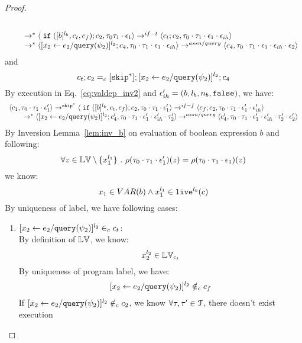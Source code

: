 \begin{proof}
\begin{case}[$\trace_2 = \trace_{ih} \cdot \event_{ih}$]
\begin{subcase}
\begin{subsubcase}
\begin{subproof}
\[\begin{array}{l}
  \\
  \qquad \rightarrow^{*} 
  \langle \;\mathtt{if}\; ([b]^{l_b}, c_t, c_f);{c}_2, \mathtt{\tau}_0 \mathtt{\tau}_1 \cdot \mathtt{\epsilon}_1 \rangle 
  \rightarrow^{if-t} 
  \langle c_t;c_2, \mathtt{\tau}_0 \cdot \mathtt{\tau}_1 \cdot \mathtt{\epsilon}_1 \cdot \mathtt{\epsilon}_{ih} \rangle 
  \\
  \qquad \rightarrow^{*} 
  \langle [\mathrel{ {x}_2 \leftarrow e_2 / {\tt query}(\psi_2) }]^{l_2};{c}_4, 
  \mathtt{\tau}_0 \cdot \mathtt{\tau}_1 \cdot \mathtt{\epsilon}_1 \cdot \mathtt{\epsilon}_{ih} \rangle 
  \rightarrow^{assn/query} 
  \langle {c}_4,  \mathtt{\tau}_0 \cdot \mathtt{\tau}_1 \cdot \mathtt{\epsilon}_1 \cdot \mathtt{\epsilon}_{ih} \cdot \mathtt{\epsilon}_2 \rangle 
  \end{array}
\]
and 
\[
  c_t;c_2 =_c [\mathtt{skip}^*]; [\mathrel{ {x}_2 \leftarrow e_2 / {\tt query}(\psi_2) }]^{l_2};{c}_4
\]
%
By execution in Eq.~\ref{eq:valdep_inv2} and $\mathtt{\epsilon}_{ih}' = (b, l_b, n_b, \mathtt{false})$, we have:
\begin{equation}
\label{eq:m1testif_inv2}
  \begin{array}{l}   
  \langle c_1, \mathtt{\tau}_0 \cdot \mathtt{\tau}_1 \cdot \mathtt{\epsilon}_1' \rangle 
  \rightarrow^{\mathtt{skip}^*} 
  \langle \;\mathtt{if}\; ([b]^{l_b}, c_t, c_f); {c}_2, \mathtt{\tau}_0 \cdot \mathtt{\tau}_1 \cdot \mathtt{\epsilon}_1' \rangle 
  \rightarrow^{if-f} 
  \langle c_f;c_2, \mathtt{\tau}_0 \cdot \mathtt{\tau}_1 \cdot \mathtt{\epsilon}_1' \cdot \mathtt{\epsilon}_{ih}' \rangle 
  \\
  \qquad \rightarrow^{*} 
  \langle [\mathrel{ {x}_2 \leftarrow e_2 / {\tt query}(\psi_2) }]^{l_2};{c}_4', 
  \mathtt{\tau}_0 \cdot \mathtt{\tau}_1 \cdot \mathtt{\epsilon}_1' \cdot \mathtt{\epsilon}_{ih}' \cdot \mathtt{\tau}_2' \rangle
  \rightarrow^{assn/query} 
  \langle {c}_4',  \mathtt{\tau}_0 \cdot \mathtt{\tau}_1 \cdot \mathtt{\epsilon}_1' \cdot \mathtt{\epsilon}_{ih}' \cdot \mathtt{\tau}_2' \cdot \mathtt{\epsilon}_2' \rangle 
\end{array}
\end{equation}
By Inversion Lemma~\ref{lem:inv_b} on evaluation of boolean expression $b$ and following: 
\[
  \forall z \in \mathbb{LV} \setminus \{x_1^{l_1}\} ~.~
  \rho(\mathtt{\tau}_0 \cdot \mathtt{\tau}_1 \cdot \mathtt{\epsilon}_1')(z) = \rho(\mathtt{\tau}_0 \cdot \mathtt{\tau}_1 \cdot \mathtt{\epsilon}_1)(z)
\]
we know:
\[
  x_1 \in VAR(b) \land x_1^{l_1} \in \mathtt{live}^{l_b}(c)
\]
%
 By uniqueness of label, we have following cases:
 \begin{enumerate}
 \item $[\mathrel{ {x}_2 \leftarrow e_2 / {\tt query}(\psi_2) }]^{l_2} \in_c c_t$:
\\
By definition of $\mathbb{LV}$, we know:
\[
  x_2^{l_2} \in \mathbb{LV}_{c_t}
\]
%
 By uniqueness of program label, we have:
 \[
 [\mathrel{ {x}_2 \leftarrow e_2 / {\tt query}(\psi_2) }]^{l_2} \notin_c c_f
 \]
 If $[\mathrel{ {x}_2 \leftarrow e_2 / {\tt query}(\psi_2) }]^{l_2} \notin_c c_2$,
we know $\forall \mathtt{\tau}, \mathtt{\tau}' \in \mathcal{T}$, there doesn't exist execution

\end{enumerate}
\end{subproof}
\end{subsubcase}
\end{subcase}
\end{case}
\end{proof}
